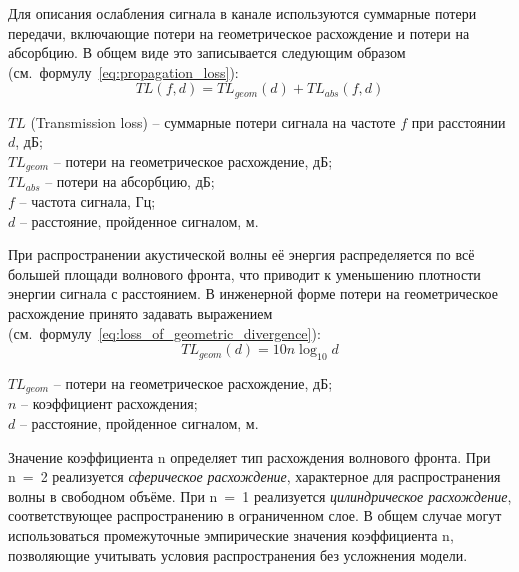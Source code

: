 \documentclass[
    numbers=section,
    document-code={ВКРБ--09.03.04--10.19--XX--26--81}
]{../latex/fqw}
\begin{document}
    Для описания ослабления сигнала в канале используются суммарные потери передачи,
    включающие потери на геометрическое расхождение и потери на абсорбцию.
    В общем виде это записывается следующим образом (см.~формулу~\eqref{eq:propagation_loss}):
    \begin{equation}
        TL(f,d) = {TL}_{geom}(d) + {TL}_{abs}(f,d)
        \label{eq:propagation_loss}
    \end{equation}
    \begin{FqwWhere}
        \(TL\) (Transmission loss) -- суммарные потери сигнала на частоте \(f\) при расстоянии \(d\), дБ;\\
        \({TL}_{geom}\) -- потери на геометрическое расхождение, дБ;\\
        \({TL}_{abs}\) -- потери на абсорбцию, дБ;\\
        \(f\) -- частота сигнала, Гц;\\
        \(d\) -- расстояние, пройденное сигналом, м.
    \end{FqwWhere}

    При распространении акустической волны её энергия распределяется по всё большей площади волнового фронта,
    что приводит к уменьшению плотности энергии сигнала с расстоянием.
    В инженерной форме потери на геометрическое расхождение принято задавать выражением
    (см.~формулу~\eqref{eq:loss_of_geometric_divergence}):
    \begin{equation}
        {TL}_{geom}(d) = 10n\log_{10}d
        \label{eq:loss_of_geometric_divergence}
    \end{equation}
    \begin{FqwWhere}
        \({TL}_{geom}\) -- потери на геометрическое расхождение, дБ;\\
        \(n\) -- коэффициент расхождения;\\
        \(d\) -- расстояние, пройденное сигналом, м.
    \end{FqwWhere}

    Значение коэффициента n определяет тип расхождения волнового фронта.
    При n~=~2 реализуется \emph{сферическое расхождение}, характерное для распространения волны в свободном объёме.
    При n~=~1 реализуется \emph{цилиндрическое расхождение}, соответствующее распространению в ограниченном слое.
    В общем случае могут использоваться промежуточные эмпирические значения коэффициента n,
    позволяющие учитывать условия распространения без усложнения модели.
\end{document}
